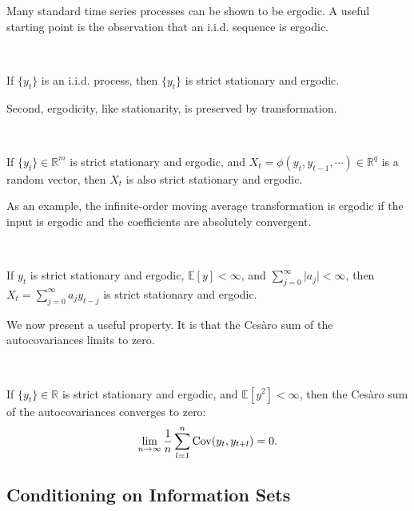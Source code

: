 Many standard time series processes can be shown to be ergodic.
A useful starting point is the observation that an i.i.d. sequence is ergodic. 

\begin{theorem}\label{thm:iid-ergodic}
    \

    If $\{y_t\}$ is an i.i.d. process, then $\{y_t\}$ is strict stationary and ergodic.    
\end{theorem}

Second, ergodicity, like stationarity, is preserved by transformation.
\begin{theorem}\label{thm:ergodicity-transformation-invariance}
    \

    If $\{y_t\} \in \mathbb{R}^m$ is strict stationary and ergodic,
    and $X_t = \phi (y_t, y_{t-1}, \cdots) \in \mathbb{R}^q$ is a random vector,
    then $X_t$ is also strict stationary and ergodic.
\end{theorem}

As an example, the infinite-order moving average transformation is ergodic
if the input is ergodic and the coefficients are absolutely convergent.

\begin{theorem}
    \

    If $y_t$ is strict stationary and ergodic, $\mathbb{E}[y] < \infty$,
    and $\sum_{j=0}^{\infty} \vert a_j \vert < \infty$,
    then $X_t = \sum_{j=0}^{\infty} a_j y_{t-j}$ is strict stationary and ergodic.    
\end{theorem}

We now present a useful property. It is that the Cesàro sum of the autocovariances limits to zero.

\begin{theorem}\label{thm:cesaro-sum-autocovariances}
    \

    If $\{y_t\} \in \mathbb{R}$ is strict stationary and ergodic, and $\mathbb{E}[y^2] < \infty$,
    then the Cesàro sum of the autocovariances converges to zero:
    \begin{gather*}
        \lim_{n \to \infty} \frac{1}{n} \sum_{l=1}^{n} \Cov(y_t, y_{t+l}) = 0.
    \end{gather*}    
\end{theorem}

\subsection{Conditioning on Information Sets}

